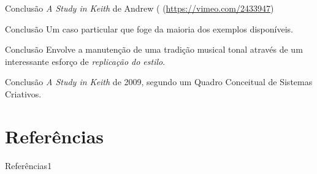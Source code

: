 \documentclass[aspectratio=169]{beamer}
\begin{document}
\begin{frame}{Conclusão}
  \emph{A Study in Keith} de Andrew  ( (\url{https://vimeo.com/2433947})
  
  \end{frame}

\begin{frame}{Conclusão}
Um caso particular que foge da maioria dos exemplos disponíveis.
\end{frame}

\begin{frame}{Conclusão}
Envolve a manutenção de uma tradição musical tonal através de um interessante esforço de \emph{replicação do estilo}.
\end{frame}

\begin{frame}{Conclusão}
 \emph{A Study in Keith} de 2009, segundo um Quadro Conceitual de Sistemas Criativos. 
 \end{frame}




\section*{Referências}


\begin{frame}[allowframebreaks]{Referências}1

\end{frame}

\end{document}
